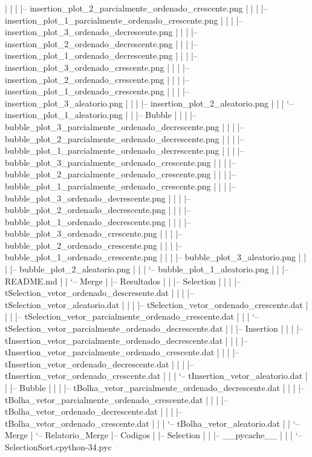 \documentclass[12pt,a4paper,twoside]{report}
\begin{document}
\begin{terminal}
|   |   |   |-- insertion_plot_2_parcialmente_ordenado_crescente.png
|   |   |   |-- insertion_plot_1_parcialmente_ordenado_crescente.png
|   |   |   |-- insertion_plot_3_ordenado_decrescente.png
|   |   |   |-- insertion_plot_2_ordenado_decrescente.png
|   |   |   |-- insertion_plot_1_ordenado_decrescente.png
|   |   |   |-- insertion_plot_3_ordenado_crescente.png
|   |   |   |-- insertion_plot_2_ordenado_crescente.png
|   |   |   |-- insertion_plot_1_ordenado_crescente.png
|   |   |   |-- insertion_plot_3_aleatorio.png
|   |   |   |-- insertion_plot_2_aleatorio.png
|   |   |   `-- insertion_plot_1_aleatorio.png
|   |   |-- Bubble
|   |   |   |-- bubble_plot_3_parcialmente_ordenado_decrescente.png
|   |   |   |-- bubble_plot_2_parcialmente_ordenado_decrescente.png
|   |   |   |-- bubble_plot_1_parcialmente_ordenado_decrescente.png
|   |   |   |-- bubble_plot_3_parcialmente_ordenado_crescente.png
|   |   |   |-- bubble_plot_2_parcialmente_ordenado_crescente.png
|   |   |   |-- bubble_plot_1_parcialmente_ordenado_crescente.png
|   |   |   |-- bubble_plot_3_ordenado_decrescente.png
|   |   |   |-- bubble_plot_2_ordenado_decrescente.png
|   |   |   |-- bubble_plot_1_ordenado_decrescente.png
|   |   |   |-- bubble_plot_3_ordenado_crescente.png
|   |   |   |-- bubble_plot_2_ordenado_crescente.png
|   |   |   |-- bubble_plot_1_ordenado_crescente.png
|   |   |   |-- bubble_plot_3_aleatorio.png
|   |   |   |-- bubble_plot_2_aleatorio.png
|   |   |   `-- bubble_plot_1_aleatorio.png
|   |   |-- README.md
|   |   `-- Merge
|   |-- Resultados
|   |   |-- Selection
|   |   |   |-- tSelection_vetor_ordenado_descresente.dat
|   |   |   |-- tSelection_vetor_aleatorio.dat
|   |   |   |-- tSelection_vetor_ordenado_crescente.dat
|   |   |   |-- tSelection_vetor_parcialmente_ordenado_crescente.dat
|   |   |   `-- tSelection_vetor_parcialmente_ordenado_decrescente.dat
|   |   |-- Insertion
|   |   |   |-- tInsertion_vetor_parcialmente_ordenado_decrescente.dat
|   |   |   |-- tInsertion_vetor_parcialmente_ordenado_crescente.dat
|   |   |   |-- tInsertion_vetor_ordenado_decrescente.dat
|   |   |   |-- tInsertion_vetor_ordenado_crescente.dat
|   |   |   `-- tInsertion_vetor_aleatorio.dat
|   |   |-- Bubble
|   |   |   |-- tBolha_vetor_parcialmente_ordenado_decrescente.dat
|   |   |   |-- tBolha_vetor_parcialmente_ordenado_crescente.dat
|   |   |   |-- tBolha_vetor_ordenado_decrescente.dat
|   |   |   |-- tBolha_vetor_ordenado_crescente.dat
|   |   |   `-- tBolha_vetor_aleatorio.dat
|   |   `-- Merge
|   `-- Relatorio_Merge
|-- Codigos
|   |-- Selection
|   |   |-- __pycache__
|   |   |   `-- SelectionSort.cpython-34.pyc

\end{terminal}
\end{document}
